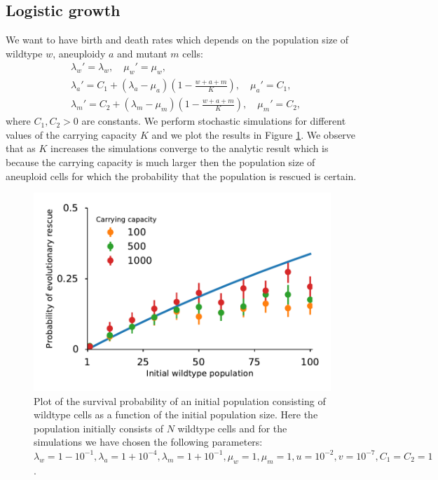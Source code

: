 \documentclass[12pt]{extarticle}
\begin{document}
\subsection*{Logistic growth}
We want to have birth and death rates which depends on the population size of wildtype $w$, aneuploidy $a$ and mutant $m$ cells:
\begin{align*}
&\lambda_w'=\lambda_w,\quad\mu_w'=\mu_w,\\
&\lambda_a'=C_1+\left(\lambda_a-\mu_a\right)\left(1-\frac{w+a+m}{K}\right),\quad \mu_a'=C_1,\\
&\lambda_m'=C_2+\left(\lambda_m-\mu_m\right)\left(1-\frac{w+a+m}{K}\right),\quad \mu_m'=C_2,
\end{align*}
where $C_1, C_2>0$ are constants. We perform stochastic simulations for different values of the carrying capacity $K$ and we plot the results in Figure \ref{SurvPlotNDataLogisticKComplete}.  We observe that as $K$ increases the simulations converge to the analytic result which is because the carrying capacity is much larger then the population size of aneuploid cells for which the probability that the population is rescued is certain.

\begin{figure}[!t]
 \vspace*{1\baselineskip}
\includegraphics[width=1\textwidth]{Figures/SurvPlotNDataLogisticKComplete.pdf}
\caption{Plot of the survival probability of an initial population consisting of wildtype cells as a function of the initial population size.  Here the population initially consists of $N$ wildtype cells and for the simulations we have chosen the following parameters: $\lambda_w=1-10^{-1},\lambda_a=1+10^{-4},\lambda_m=1+10^{-1},\mu_w=1,\mu_m=1,u=10^{-2},v=10^{-7}, C_1=C_2=1$.}
\label{SurvPlotNDataLogisticKComplete}
\end{figure}
\end{document}
